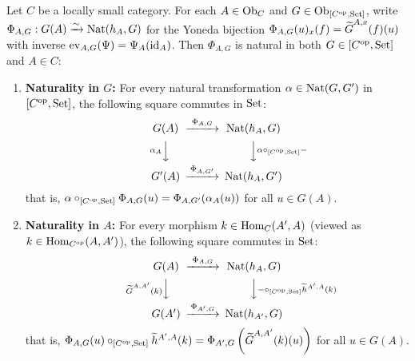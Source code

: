 \documentclass[10pt,a4paper]{article}
\begin{document}
\begin{theorem}\label{thm:yoneda_nat}
Let $C$ be a locally small category. For each $A \in {\textrm{Ob}}_C$ and $G \in {\textrm{Ob}}_{[C^{\textrm{op}}, {\textrm{Set}}]}$, write $\Phi_{A,G} : G(A) \xrightarrow{\sim} {\textrm{Nat}}(h_A, G)$ for the Yoneda bijection $\Phi_{A,G}(u)_x(f) = {\widetilde{G}\textrm{}}^{A,x}(f)(u)$ with inverse $\mathrm{ev}_{A,G}(\Psi) = \Psi_A({\textrm{id}}_A)$. Then $\Phi_{A,G}$ is natural in both $G \in [C^{\textrm{op}}, {\textrm{Set}}]$ and $A \in C$:
\begin{enumerate}
\item \textbf{Naturality in $G$:} For every natural transformation $\alpha \in {\textrm{Nat}}(G, G')$ in $[C^{\textrm{op}}, {\textrm{Set}}]$, the following square commutes in ${\textrm{Set}}$:
$$\begin{CD}
G(A) @>{\Phi_{A,G}}>> \Nat(h_A, G) \\
@V{\alpha_A}VV @VV{\alpha \circ_{[C^\op,\Set]} -}V \\
G'(A) @>{\Phi_{A,G'}}>> \Nat(h_A, G')
\end{CD}$$
that is, $\alpha \circ_{[C^{\textrm{op}},{\textrm{Set}}]} \Phi_{A,G}(u) = \Phi_{A,G'}(\alpha_A(u))$ for all $u \in G(A)$.
\item \textbf{Naturality in $A$:} For every morphism $k \in {\textrm{Hom}}_C(A', A)$ (viewed as $k \in {\textrm{Hom}}_{C^{\textrm{op}}}(A, A')$), the following square commutes in ${\textrm{Set}}$:
$$\begin{CD}
G(A) @>{\Phi_{A,G}}>> \Nat(h_A, G) \\
@V{\GMor^{A,A'}(k)}VV @VV{- \circ_{[C^\op,\Set]} \widetilde{h}^{A',A}(k)}V \\
G(A') @>{\Phi_{A',G}}>> \Nat(h_{A'}, G)
\end{CD}$$
that is, $\Phi_{A,G}(u) \circ_{[C^{\textrm{op}},{\textrm{Set}}]} \widetilde{h}^{A',A}(k) = \Phi_{A',G}\left({\widetilde{G}\textrm{}}^{A,A'}(k)(u)\right)$ for all $u \in G(A)$.
\end{enumerate}
\end{theorem}
\myprf
\end{document}
